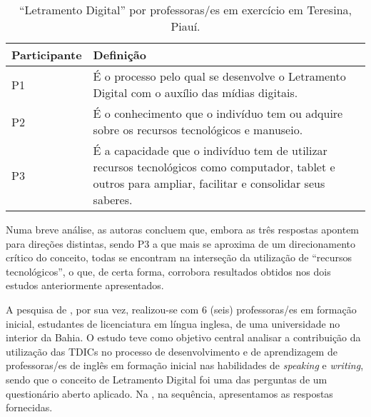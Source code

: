 \documentclass[portuguese]{textolivre}
\begin{document}
\begin{table}[h!]
\centering
\begin{threeparttable}
\caption{“Letramento Digital” por professoras/es em exercício em Teresina, Piauí.}
\label{Tabela03}
\begin{tabular}{lp{}}
\toprule
Participante & Definição \\
\midrule
P1 & É o processo pelo qual se desenvolve o Letramento Digital com o auxílio das mídias digitais. \\
P2 & É o conhecimento que o indivíduo tem ou adquire sobre os recursos tecnológicos e manuseio.\\
P3 & É a capacidade que o indivíduo tem de utilizar recursos tecnológicos como computador, tablet e outros para ampliar, facilitar e consolidar seus saberes.\\
\bottomrule
\end{tabular}
\end{threeparttable}
\end{table} 

Numa breve análise, as autoras concluem que, embora as três respostas apontem para direções distintas, sendo P3 a que mais se aproxima de um direcionamento crítico do conceito, todas se encontram na interseção da utilização de “recursos tecnológicos”, o que, de certa forma, corrobora resultados obtidos nos dois estudos anteriormente apresentados.

A pesquisa de \textcite{_santos_letramento_2018}, por sua vez, realizou-se com 6 (seis) professoras/es em formação inicial, estudantes de licenciatura em língua inglesa, de uma universidade no interior da Bahia. O estudo teve como objetivo central analisar a contribuição da utilização das TDICs no processo de desenvolvimento e de aprendizagem de professoras/es de inglês em formação inicial nas habilidades de \textit{speaking} e \textit{writing}, sendo que o conceito de Letramento Digital foi uma das perguntas de um questionário aberto aplicado. Na , na sequência, apresentamos as respostas fornecidas.
\end{document}
